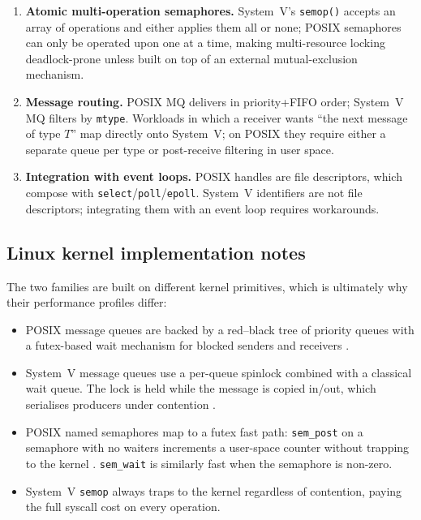 \documentclass[a4paper,11pt]{article}
\begin{document}
\begin{enumerate}[leftmargin=*]
\item \textbf{Atomic multi-operation semaphores.} System~V's
\texttt{semop()} accepts an array of operations and either applies them
all or none; POSIX semaphores can only be operated upon one at a time,
making multi-resource locking deadlock-prone unless built on top of an
external mutual-exclusion mechanism.
\item \textbf{Message routing.} POSIX MQ delivers in priority+FIFO order;
System~V MQ filters by \texttt{mtype}. Workloads in which a receiver wants
``the next message of type $T$'' map directly onto System~V; on POSIX they
require either a separate queue per type or post-receive filtering in
user space.
\item \textbf{Integration with event loops.} POSIX handles are file
descriptors, which compose with \texttt{select}/\texttt{poll}/\texttt{epoll}.
System~V identifiers are not file descriptors; integrating them with an
event loop requires workarounds.
\end{enumerate}

\subsection{Linux kernel implementation notes}
The two families are built on different kernel primitives, which is
ultimately why their performance profiles differ:

\begin{itemize}[leftmargin=*]
\item POSIX message queues are backed by a red--black tree of priority
queues with a futex-based wait mechanism for blocked senders and receivers
\cite{linux_mq_overview}.
\item System~V message queues use a per-queue spinlock combined with a
classical wait queue. The lock is held while the message is copied
in/out, which serialises producers under contention \cite{linux_sysvipc}.
\item POSIX named semaphores map to a futex fast path: \texttt{sem\_post}
on a semaphore with no waiters increments a user-space counter without
trapping to the kernel \cite{drepper2011futexes, linux_futex}.
\texttt{sem\_wait} is similarly fast when the semaphore is non-zero.
\item System~V \texttt{semop} always traps to the kernel regardless of
contention, paying the full syscall cost on every operation.
\end{itemize}
\end{document}
